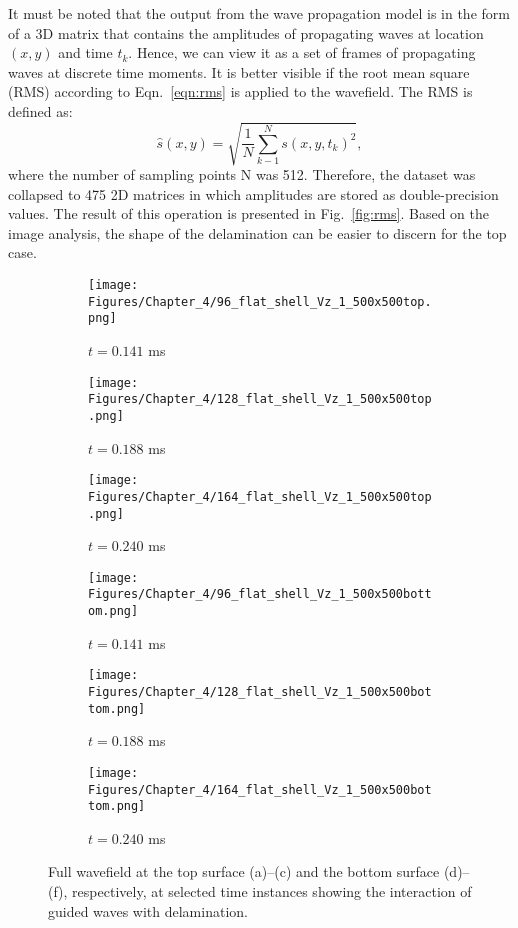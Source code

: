 It must be noted that the output from the wave propagation model is in the form of a 3D matrix that contains the amplitudes of propagating waves at location $(x,y)$ and time $t_k$.
Hence, we can view it as a set of frames of propagating waves at discrete time moments.
It is better visible if the root mean square (RMS) according to Eqn.~\ref{eqn:rms} is applied to the wavefield.
The RMS is defined as:
\begin{equation}
	\hat{s}(x,y) = \sqrt{\frac{1}{N}\sum_{k-1}^{N}s(x,y,t_k)^2}, 
	\label{eqn:rms} 
\end{equation}
where the number of sampling points N was 512. 
Therefore, the dataset was collapsed to 475 2D matrices in which amplitudes are stored as double-precision values.
The result of this operation is presented in Fig.~\ref{fig:rms}.
Based on the image analysis, the shape of the delamination can be easier to discern for the top case.
\begin{figure} [!ht]
	\centering
	\begin{subfigure}[b]{0.32\textwidth}
		\centering
		\texttt{[image: Figures/Chapter\_4/96\_flat\_shell\_Vz\_1\_500x500top.png]}
		\caption{\(t=0.141\) ms}
		\label{fig:frame96top}
	\end{subfigure}
	\hfill
	\begin{subfigure}[b]{0.32\textwidth}
		\centering
		\texttt{[image: Figures/Chapter\_4/128\_flat\_shell\_Vz\_1\_500x500top.png]}
		\caption{\(t=0.188\) ms}
		\label{fig:frame128top}
	\end{subfigure}
	\hfill
	\begin{subfigure}[b]{0.32\textwidth}
		\centering
		\texttt{[image: Figures/Chapter\_4/164\_flat\_shell\_Vz\_1\_500x500top.png]}
		\caption{\(t=0.240\) ms}
		\label{fig:frame164top}
	\end{subfigure}	
	\hfill
	\begin{subfigure}[b]{0.32\textwidth}
		\centering
		\texttt{[image: Figures/Chapter\_4/96\_flat\_shell\_Vz\_1\_500x500bottom.png]}
		\caption{\(t=0.141\) ms}
		\label{fig:frame96bottom}
	\end{subfigure}
	\hfill
	\begin{subfigure}[b]{0.32\textwidth}
		\centering
		\texttt{[image: Figures/Chapter\_4/128\_flat\_shell\_Vz\_1\_500x500bottom.png]}
		\caption{\(t=0.188\) ms}
		\label{fig:frame128bottom}
	\end{subfigure}
	\hfill
	\begin{subfigure}[b]{0.32\textwidth}
		\centering
		\texttt{[image: Figures/Chapter\_4/164\_flat\_shell\_Vz\_1\_500x500bottom.png]}
		\caption{\(t=0.240\) ms}
		\label{fig:frame164bottom}
	\end{subfigure}
	
	\caption{Full wavefield at the top surface (a)--(c) and the bottom surface (d)--(f), respectively, at selected time instances showing the interaction of guided waves with delamination.}
	\label{fig:wavefield}
\end{figure} 

